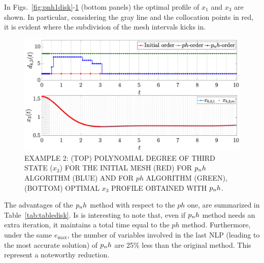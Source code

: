 In Figs.~\ref{fig:pnh1disk}-\ref{fig:pnh2disk} (bottom panels) the optimal profile of $x_1$ and $x_3$ are shown. In particular, considering the gray line and the collocation points in red, it is evident where the subdivision of the mesh intervals kicks in.
\begin{figure}[t]
	\centering
	\includegraphics[trim={1cm 0.1cm 2cm 1.05cm},clip,width=1.\columnwidth]{Img/pnh2_disk2}
	\caption{EXAMPLE 2: (TOP) POLYNOMIAL DEGREE OF THIRD STATE ($x_{3}$) FOR THE INITIAL MESH (RED) FOR $p_{n}h$ ALGORITHM (BLUE) AND FOR $ph$ ALGORITHM (GREEN), (BOTTOM)
	OPTIMAL $x_3$ PROFILE OBTAINED WITH $p_{n}h$.}
	\label{fig:pnh2disk}
\end{figure}
The advantages of the $p_{n}h$ method with respect to the $ph$ one, are summarized in Table~\ref{tab:tabledisk}. Is is interesting to note that, even if $p_{n}h$ method needs an extra iteration, it maintains a total time equal to the $ph$ method. Furthermore, under the same $e_{\max}$, the number of variables involved in the last NLP (leading to the most accurate solution) of $p_{n}h$ are 25\% less than the original method. This represent a noteworthy reduction.

